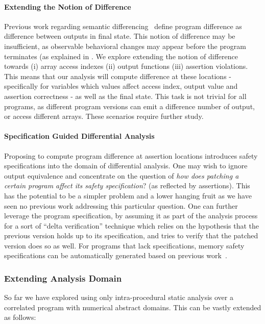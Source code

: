 \paragraph{Extending the Notion of Difference}
Previous work regarding semantic differencing~\cite{DwyerElbaumPerson08, GodlinStrichman09, EnglerRamos11, HawblitzelKawaguchiLahiriRebelo12} define program difference as difference between outputs in final state. This notion of difference may be insufficient, as observable behavioral changes may appear before the program terminates (as explained in . We explore extending the notion of difference towards (i) array access indexes (ii) output functions (iii) assertion violations. This means that our analysis will compute difference at these locations - specifically for variables which values affect access index, output value and assertion correctness - as well as the final state. This task is not trivial for all programs, as different program versions can emit a difference number of output, or access different arrays. These scenarios require further study.

\paragraph{Specification Guided Differential Analysis}
Proposing to compute program difference at assertion locations introduces safety specifications into the domain of differential analysis. One may wish to ignore output equivalence and concentrate on the question of \emph{how does patching a certain program affect its safety specification}? (as reflected by assertions). This has the potential to be a simpler problem and a lower hanging fruit as we have seen no previous work addressing this particular question. One can further leverage the program specification, by assuming it as part of the analysis process for a sort of ``delta verification'' technique which relies on the hypothesis that the previous version holds up to its specification, and tries to verify that the patched version does so as well. For programs that lack specifications, memory safety specifications can be automatically generated based on previous work~\cite{ConditHarrenMcPeakNeculaWeimer03}.


\subsubsection{Extending Analysis Domain}

So far we have explored using only intra-procedural static analysis over a correlated program with numerical abstract domains. This can be vastly extended as follows:

